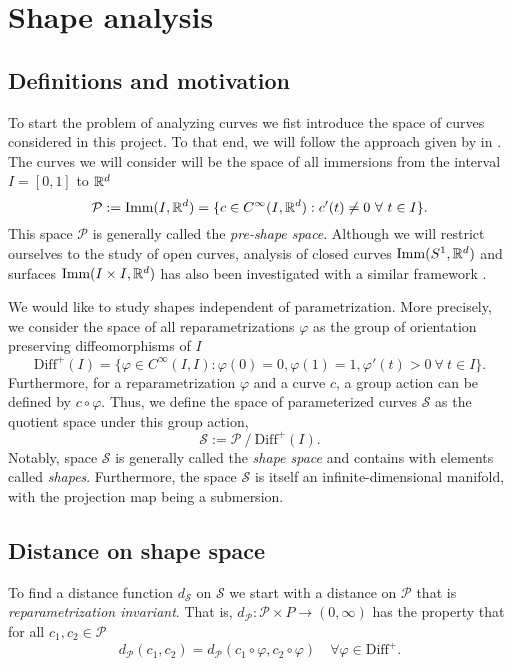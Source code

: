 \section{Shape analysis}
\subsection{Definitions and motivation}
To start the problem of analyzing curves we fist introduce the space of curves considered in this project.  To that end, we will follow the approach given by \citeauthor{bauer2015why} in \cite{bauer2015why}. The curves we will consider will be the space of all immersions from the interval  \(I = [0, 1]\) to  \(\mathbb{R}^d\)
\begin{equation*}
  \mathcal{P}:= \text{Imm}(I, \mathbb{R}^d) = \{c \in C^{\infty}(I, \mathbb{R}^d) :  c'(t) \neq  0 \ \forall \ t \in I  \}.
\end{equation*}
This space \(\mathcal{P}\) is generally called the \emph{pre-shape space}. Although we will restrict ourselves to the study of open curves, analysis of closed curves \(\text{Imm}(S^1, \mathbb{R}^d)\) and surfaces \(\text{Imm}(I \times I, \mathbb{R}^d)\) has also been investigated with a similar framework \cite{bauer2014overview}.

We would like to study shapes independent of parametrization. More precisely, we consider the space of all reparametrizations \(\varphi\) as the group of orientation preserving diffeomorphisms of \(I\)
\begin{equation*}
  \text{Diff}^+(I) = \{\varphi \in C^{\infty}(I,I): \varphi(0) = 0, \varphi(1) = 1, \varphi'(t) > 0 \ \forall \ t \in I \}.
\end{equation*}
Furthermore, for a reparametrization  \(\varphi \) and a curve  \(c\), a group action can be defined by  \(c \circ \varphi\). Thus, we define the space of parameterized curves \(\mathcal{S}\) as the quotient space under this group action,
\begin{equation*}
  \mathcal{S} := \mathcal{P} \ / \ {\text{Diff}^+(I)}.
\end{equation*}
Notably, space  \(\mathcal{S}\) is generally called the \emph{shape space} and contains with elements called \emph{shapes}. Furthermore, the space \(\mathcal{S}\) is itself an infinite-dimensional manifold, with the projection map being a submersion.

\subsection{Distance on shape space}
To find a distance function \(d_{\mathcal{S}}\) on \(\mathcal{S}\) we start with a distance on \(\mathcal{\mathcal{P}}\) that is \emph{reparametrization invariant}. That is, \(d_\mathcal{P} : \mathcal{P} \times P \rightarrow (0, \infty)\) has the property that for all  \(c_1, c_2 \in \mathcal{P}\)
\begin{equation*}
  d_{\mathcal{P}}(c_1, c_2)=d_{\mathcal{P}}(c_1 \circ \varphi, c_2\circ \varphi) \quad \forall \varphi \in \text{Diff}^+.
\end{equation*}

